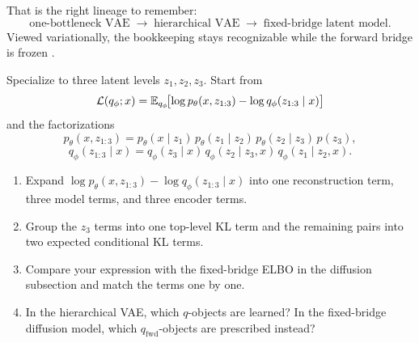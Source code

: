 \documentclass[11pt]{article}
\begin{document}
That is the right lineage to remember:
\[
  \text{one-bottleneck VAE}
  \;\longrightarrow\;
  \text{hierarchical VAE}
  \;\longrightarrow\;
  \text{fixed-bridge latent model}.
\]
Viewed variationally, the bookkeeping stays recognizable while the forward bridge is frozen
\citep[Thm.~2.2.3 and the remark on p.~52]{lai_song_kim_mitsufuji_ermon_2025_principles_diffusion}
\citep[\S\S3--4]{kingma_salimans_poole_ho_2021_variational_diffusion}.

\begin{exercise}
\label{ex:hierarchy-fixed-encoder}
Specialize  to three latent levels \(z_1,z_2,z_3\).
Start from
\[
  \mathcal{L}(q_\phi;x)
  =
  \mathbb{E}_{q_\phi}\!\bigl[\log p_\theta(x,z_{1:3})-\log q_\phi(z_{1:3}\mid x)\bigr]
\]
and the factorizations
\[
  p_\theta(x,z_{1:3})
  =
  p_\theta(x\mid z_1)\,p_\theta(z_1\mid z_2)\,p_\theta(z_2\mid z_3)\,p(z_3),
\]
\[
  q_\phi(z_{1:3}\mid x)
  =
  q_\phi(z_3\mid x)\,q_\phi(z_2\mid z_3,x)\,q_\phi(z_1\mid z_2,x).
\]
\begin{enumerate}[leftmargin=*]
  \item Expand \(\log p_\theta(x,z_{1:3})-\log q_\phi(z_{1:3}\mid x)\) into one reconstruction term, three model terms, and three encoder terms.
  \item Group the \(z_3\) terms into one top-level KL term and the remaining pairs into two expected conditional KL terms.
  \item Compare your expression with the fixed-bridge ELBO in the diffusion subsection and match the terms one by one.
  \item In the hierarchical VAE, which \(q\)-objects are learned?
  In the fixed-bridge diffusion model, which \(q_{\mathrm{fwd}}\)-objects are prescribed instead?
\end{enumerate}
\end{exercise}
\end{document}
